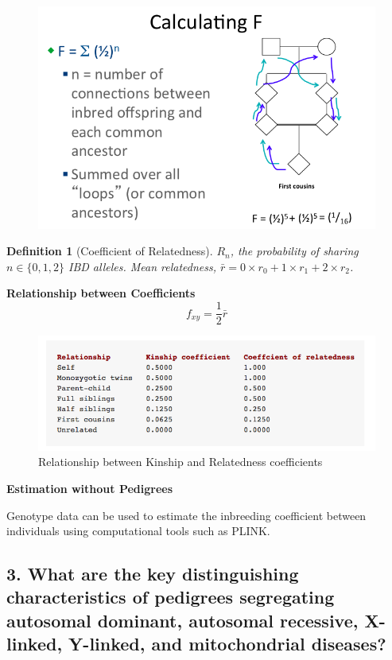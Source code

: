 \documentclass{tufte-handout}
\theoremstyle{noparens}
\newtheorem*{define}{Definition}
\begin{document}
\begin{figure}[h]
\includegraphics[scale=0.5]{./figs/kincoeff}
\end{figure}

\begin{define}[Coefficient of Relatedness]
$R_n$, the probability of sharing $n \in \{0,1,2\}$ IBD alleles. Mean relatedness, $\bar{r} = 0 \times r_0 + 1 \times r_1 + 2 \times r_2$.
\end{define}

\noindent
\textbf{Relationship between Coefficients}
\[f_{xy} = \frac{1}{2}\bar{r}\]
\begin{figure}[H]
\includegraphics[scale=0.5]{./figs/kinrelate}
\caption{Relationship between Kinship and Relatedness coefficients}
\end{figure}

\noindent
\textbf{Estimation without Pedigrees}

Genotype data can be used to estimate the inbreeding coefficient between individuals using computational tools such as PLINK.

\newpage
\subsection{3. What are the key distinguishing characteristics of pedigrees segregating autosomal dominant, autosomal recessive, X-linked, Y-linked, and mitochondrial diseases?}
\label{subsec:03}
\end{document}
